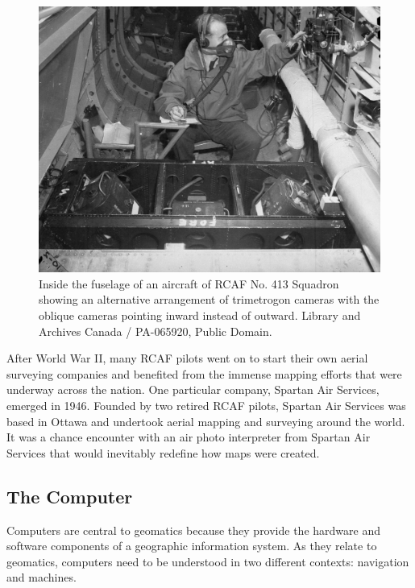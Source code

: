 \documentclass[
]{book}
\begin{document}
\begin{figure}
\includegraphics[width=0.75\linewidth]{images/01-no-413-squadron} \caption{Inside the fuselage of an aircraft of RCAF No. 413 Squadron showing an alternative arrangement of trimetrogon cameras with the oblique cameras pointing inward instead of outward. Library and Archives Canada / PA-065920, Public Domain.}\label{fig:1-no-413-squadron}
\end{figure}

After World War II, many RCAF pilots went on to start their own aerial surveying companies and benefited from the immense mapping efforts that were underway across the nation. One particular company, Spartan Air Services, emerged in 1946. Founded by two retired RCAF pilots, Spartan Air Services was based in Ottawa and undertook aerial mapping and surveying around the world. It was a chance encounter with an air photo interpreter from Spartan Air Services that would inevitably redefine how maps were created.

\subsection{The Computer}\label{the-computer}

Computers are central to geomatics because they provide the hardware and software components of a geographic information system. As they relate to geomatics, computers need to be understood in two different contexts: navigation and machines.
\end{document}
